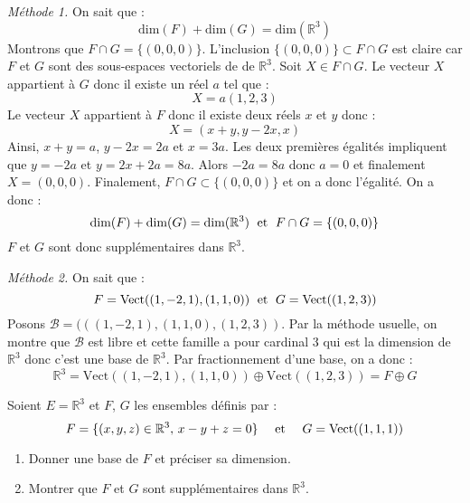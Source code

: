 \documentclass[a4paper,10pt]{report}
\begin{document}
\medskip

\noindent \textit{Méthode 1.} On sait que :
$$ \textrm{dim}(F) + \textrm{dim}(G) = \textrm{dim}(\mathbb{R}^3)$$
Montrons que $F \cap G = \lbrace (0,0,0) \rbrace$. L'inclusion $ \lbrace (0,0,0) \rbrace \subset F \cap G$ est claire car $F$ et $G$ sont des sous-espaces vectoriels de de $\mathbb{R}^3$. Soit $X \in F \cap G$. Le vecteur $X$ appartient à $G$ donc il existe un réel $a$ tel que :
$$ X = a(1,2,3)$$
Le vecteur $X$ appartient à $F$ donc il existe deux réels $x$ et $y$ donc :
$$ X = (x+y,y-2x,x)$$
Ainsi, $x+y=a$, $y-2x=2a$ et $x=3a$. Les deux premières égalités impliquent que $y=-2a$ et $y=2x+2a=8a$. Alors $-2a=8a$ donc $a=0$ et finalement $X=(0,0,0)$. Finalement, $F \cap G \subset \lbrace (0,0,0) \rbrace$ et on a donc l'égalité. On a donc :
$$  \textrm{dim}(F) + \textrm{dim}(G) = \textrm{dim}(\mathbb{R}^3) \; \hbox{ et } \; F \cap G = \lbrace (0,0,0) \rbrace$$
$F$ et $G$ sont donc supplémentaires dans $\mathbb{R}^3$.

\medskip

\noindent \textit{Méthode 2.} On sait que :
$$ F=\textrm{Vect}((1,-2,1),(1,1,0)) \; \hbox{ et } \; G=\textrm{Vect}((1,2,3))$$
Posons $\mathcal{B}=(((1,-2,1),(1,1,0),(1,2,3))$. Par la méthode usuelle, on montre que $\mathcal{B}$ est libre et cette famille a pour cardinal $3$ qui est la dimension de $\mathbb{R}^3$ donc c'est une base de $\mathbb{R}^3$. Par fractionnement d'une base, on a donc :
$$ \mathbb{R}^3 =  \textrm{Vect}((1,-2,1),(1,1,0)) \oplus \textrm{Vect}((1,2,3)) = F \oplus G$$


\medskip

\begin{Exercice}{} Soient $E= \mathbb{R}^3$ et $F$, $G$ les ensembles définis par :
$$ F = \lbrace (x,y,z) \in \mathbb{R}^3, \, x-y+z=0 \rbrace \quad \hbox{ et }  \quad G = \textrm{Vect}((1,1,1)) $$

\begin{enumerate}
\item Donner une base de $F$ et préciser sa dimension.
\item Montrer que $F$ et $G$ sont supplémentaires dans $\mathbb{R}^3$.
\end{enumerate}
\end{Exercice}
\end{document}
